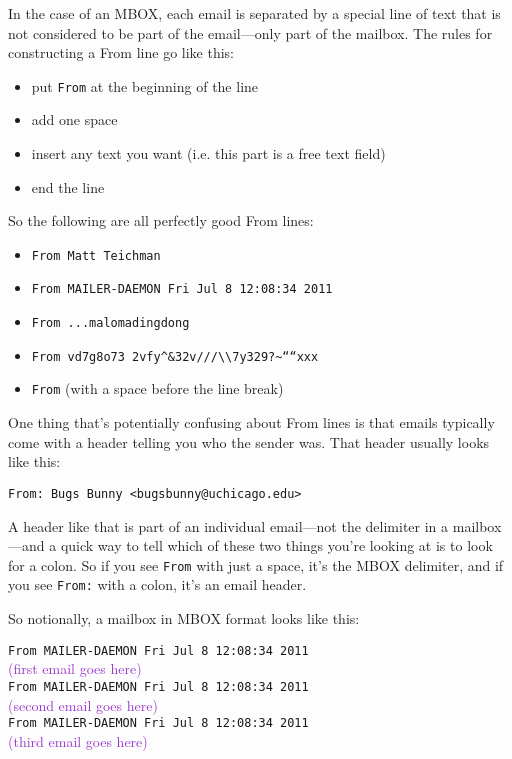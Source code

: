 \documentclass[11pt]{article}
\begin{document}
In the case of an MBOX, each email is separated by a special line of
text that is not considered to be part of the email---only part of the
mailbox.  The rules for constructing a From line go like this:

\begin{itemize}
\item put \texttt{From} at the beginning of the line
\item add one space
\item insert any text you want (i.e. this part is a free text field)
\item end the line
\end{itemize}

So the following are all perfectly good From lines:

\begin{itemize}
\item \texttt{From Matt Teichman}
\item \texttt{From MAILER-DAEMON Fri Jul  8 12:08:34 2011}
\item \texttt{From ...malomadingdong}
\item \texttt{From vd7g8o73 2vfy\textasciicircum{}\&32v///\textbackslash{}\textbackslash{}7y329?\textasciitilde{}````xxx}
\item \texttt{From} (with a space before the line break)
\end{itemize}

One thing that's potentially confusing about From lines is that emails
typically come with a header telling you who the sender was.  That
header usually looks like this:

\begin{verbatim}
From: Bugs Bunny <bugsbunny@uchicago.edu>
\end{verbatim}

A header like that is part of an individual email---not the delimiter
in a mailbox---and a quick way to tell which of these two things
you're looking at is to look for a colon.  So if you see \texttt{From} with
just a space, it's the MBOX delimiter, and if you see \texttt{From:} with a
colon, it's an email header.

So notionally, a mailbox in MBOX format looks like this:

\texttt{From MAILER-DAEMON Fri Jul  8 12:08:34 2011}\\
\textcolor{DarkOrchid}{(first email goes here)}\\
\texttt{From MAILER-DAEMON Fri Jul  8 12:08:34 2011}\\
\textcolor{DarkOrchid}{(second email goes here)}\\
\texttt{From MAILER-DAEMON Fri Jul  8 12:08:34 2011}\\
\textcolor{DarkOrchid}{(third email goes here)}\\
\vspace{-1em}
\end{document}
